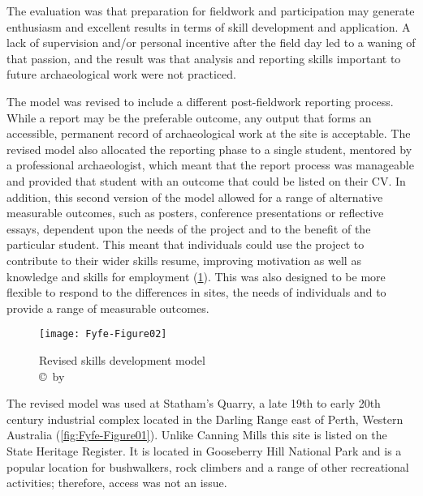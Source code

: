 	The evaluation was that preparation for fieldwork and participation may generate enthusiasm and excellent results in terms of skill development and application. 
	A lack of supervision and/or personal incentive after the field day led to a waning of that passion, and the result was that analysis and reporting skills important to future archaeological work were not practiced.
	
	The model was revised to include a different post-fieldwork reporting process. While a report may be the preferable outcome, any output that forms an accessible, permanent record of archaeological work at the site is acceptable. 
	The revised model also allocated the reporting phase to a single student, mentored by a professional archaeologist, which meant that the report process was manageable and provided that student with an outcome that could be listed on their CV. 
	In addition, this second version of the model allowed for a range of alternative measurable outcomes, such as posters, conference presentations or reflective essays, dependent upon the needs of the project and to the benefit of the particular student. 
	This meant that individuals could use the project to contribute to their wider skills resume, improving motivation as well as knowledge and skills for employment (\cref{fig:Fyfe-Figure02}). This was also designed to be more flexible to respond to the differences in sites, the needs of individuals and to provide a range of measurable outcomes.
	
	\begin{figure}[!htb] %
		\texttt{[image: Fyfe-Figure02]}
		\caption{Revised skills development model
		{\normalfont\scriptsize \\ \copyright\ by 
				                 \shortauthor
				                  }}
		\centering
		\label{fig:Fyfe-Figure02}
	\end{figure}
	
The revised model was used at Statham’s Quarry, a late 19th to early 20th century industrial complex located in the Darling Range east of Perth, Western Australia (\cref{fig:Fyfe-Figure01}). Unlike Canning Mills this site is listed on the State Heritage Register. It is located in Gooseberry Hill National Park and is a popular location for bushwalkers, rock climbers and a range of other recreational activities; therefore, access was not an issue.
	
